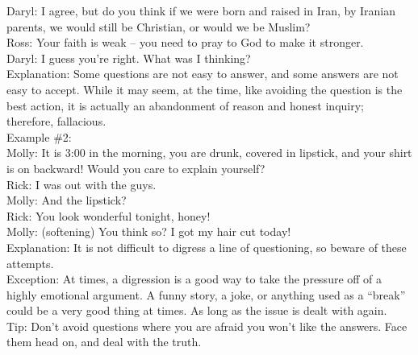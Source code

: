 \documentclass[a4paper,12pt,single,pdftex]{scrartcl}
\begin{document}
{      
        Daryl:  I agree, but do you think if we were born and raised in Iran, by Iranian parents, we would still be Christian, or would we be Muslim?
      \\

      
        Ross: Your faith is weak -- you need to pray to God to make it stronger.
      \\

      
        Daryl:  I guess you’re right.  What was I thinking?
      \\

      
        Explanation: Some questions are not easy to answer, and some answers are not easy to accept.  While it may seem, at the time, like avoiding the question is the best action, it is actually an abandonment of reason and honest inquiry; therefore, fallacious.
      \\

      
        Example \#2:
      \\

      
        Molly: It is 3:00 in the morning, you are drunk, covered in lipstick, and your shirt is on backward!  Would you care to explain yourself?
      \\

      
        Rick: I was out with the guys.
      \\

      
        Molly: And the lipstick?
      \\

      
        Rick: You look wonderful tonight, honey!
      \\

      
        Molly: (softening) You think so?  I got my hair cut today!
      \\

      
        Explanation: It is not difficult to digress a line of questioning, so beware of these attempts.
      \\

      
        Exception: At times, a digression is a good way to take the pressure off of a highly emotional argument.  A funny story, a joke,  or anything used as a “break” could be a very good thing at times.  As long as the issue is dealt with again.
      \\

      
        Tip: Don’t avoid questions where you are afraid you won’t like the answers.  Face them head on, and deal with the truth.
      \\

}
\end{document}
